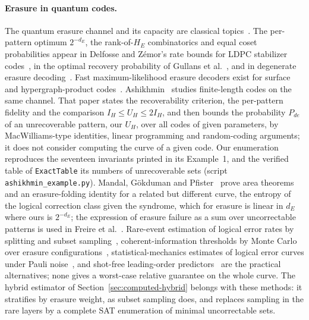 \documentclass[11pt]{article}
\theoremstyle{remark}
\newcommand{\lean}[1]{\texttt{#1}}
\begin{document}
\paragraph{Erasure in quantum codes.}
The quantum erasure channel and its capacity are classical
topics~\cite{grassl1997,bds1997}. The per-pattern optimum \(2^{-d_E}\),
the rank-of-\(H_E\) combinatorics and equal coset probabilities appear in
Delfosse and Zémor's rate bounds for LDPC stabilizer
codes~\cite{delfossezemor2013}, in the optimal recovery probability of
Gullans et al.~\cite{gullans2021}, and in degenerate erasure
decoding~\cite{kuoouyang2026}. Fast maximum-likelihood erasure decoders
exist for surface and hypergraph-product
codes~\cite{delfossezemor2020,connolly2024}. Ashikhmin~\cite{ashikhmin2020}
studies finite-length codes on the same channel. That paper states the
recoverability criterion, the per-pattern fidelity and the comparison
\(I_H\le U_H\le2I_H\), and then bounds the probability \(P_{de}\) of an
unrecoverable pattern, our \(U_H\), over all codes of given parameters,
by MacWilliams-type identities, linear programming and random-coding
arguments; it does not consider computing the curve of a given code.
Our enumeration reproduces the seventeen invariants printed in its
Example~1, and the verified table of \lean{ExactTable} its numbers of
unrecoverable sets (script \texttt{ashikhmin\_example.py}).
Mandal, Gökduman and Pfister~\cite{mandal2026area} prove area theorems
and an erasure-folding identity for a related but different curve, the
entropy of the logical correction class given the syndrome, which for
erasure is linear in \(d_E\) where ours is \(2^{-d_E}\); the expression of
erasure failure as a sum over uncorrectable patterns is used in Freire
et al.~\cite{freire2026maxwell}.
Rare-event estimation of logical error rates by splitting and subset
sampling~\cite{bravyivargo2013,heussen2024subset,mayer2026rare,beverland2025},
coherent-information thresholds by Monte Carlo over erasure
configurations~\cite{colmenarez2025}, statistical-mechanics estimates of
logical error curves under Pauli noise~\cite{wichette2026}, and shot-free
leading-order predictors~\cite{sethi2026} are the practical
alternatives; none gives a worst-case relative guarantee on the whole
curve. The hybrid estimator of Section~\ref{sec:computed-hybrid} belongs
with these methods: it stratifies by erasure weight, as subset sampling
does, and replaces sampling in the rare layers by a complete SAT
enumeration of minimal uncorrectable sets.
\end{document}
